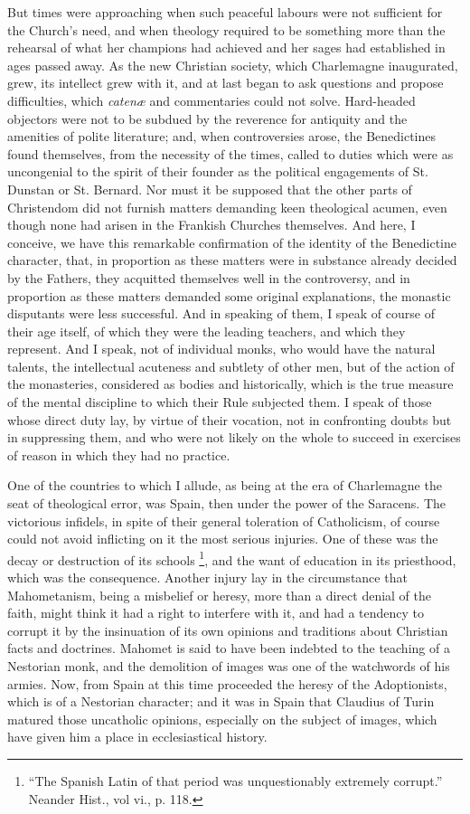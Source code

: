 But times were approaching when such peaceful labours were not
sufficient for the Church's need, and when theology required to
be something more than the rehearsal of what her champions had
achieved and her sages had established in ages passed away. As the new
Christian society, which Charlemagne inaugurated, grew, its intellect
grew with it, and at last began to ask questions and propose
difficulties, which \emph{catenæ} and commentaries could not solve.
Hard-headed objectors were not to be subdued by the reverence for
antiquity and the amenities of polite literature; and, when
controversies arose, the Benedictines found themselves, from the
necessity of the times, called to duties which were as uncongenial to
the spirit of their founder as the political engagements of St.
Dunstan or St. Bernard. Nor must it be supposed that the other parts
of Christendom did not furnish matters demanding keen theological
acumen, even though none had arisen in the Frankish Churches
themselves. And here, I conceive, we have this remarkable confirmation
of the identity of the Benedictine character, that, in proportion as
these matters were in substance already decided by the Fathers, they
acquitted themselves well in the controversy, and in proportion as
these matters demanded some original explanations, the monastic
disputants were less successful. And in speaking of them, I speak of
course of their age itself, of which they were the leading teachers,
and which they represent. And I speak, not of individual monks, who
would have the natural talents, the intellectual acuteness and
subtlety of other men, but of the action of the monasteries,
considered as bodies and historically, which is the true measure of
the mental discipline to which their Rule subjected them. I speak of
those whose direct duty lay, by virtue of their vocation, not in
confronting doubts but in suppressing them, and who were not likely on
the whole to succeed in exercises of reason in which they had no
practice.

One of the countries to which I allude, as being at the era of
Charlemagne the seat of theological error, was Spain, then under the
power of the Saracens. The victorious infidels, in spite of their
general toleration of Catholicism, of course could not avoid
inflicting on it the most serious injuries. One of these was the decay
or destruction of its schools \footnote{``The
Spanish Latin of that period was unquestionably extremely
corrupt.'' Neander Hist., vol vi., p. 118.}, and the want of education in its priesthood, which was the
consequence. Another injury lay in the circumstance that Mahometanism,
being a misbelief or heresy, more than a direct denial of the faith,
might think it had a right to interfere with it, and had a tendency to
corrupt it by the insinuation of its own opinions and traditions about
Christian facts and doctrines. Mahomet is said to have been indebted
to the teaching of a Nestorian monk, and the demolition of images was
one of the watchwords of his armies. Now, from Spain at this time
proceeded the heresy of the Adoptionists, which is of a Nestorian
character; and it was in Spain that Claudius of Turin matured those
uncatholic opinions, especially on the subject of images, which have
given him a place in ecclesiastical history.

